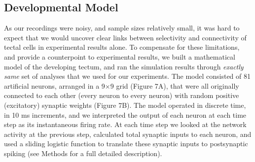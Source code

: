 \documentclass{article}
\begin{document}

\subsection*{Developmental Model}

As our recordings were noisy, and sample sizes relatively small, it was hard to expect that we would uncover clear links between selectivity and connectivity of tectal cells in experimental results alone. To compensate for these limitations, and provide a counterpoint to experimental results, we built a mathematical model of the developing tectum, and ran the simulation results through \textit{exactly same} set of analyses that we used for our experiments. The model consisted of 81 artificial neurons, arranged in a 9$\times$9 grid (Figure 7A), that were all originally connected to each other (every neuron to every neuron) with random positive (excitatory) synaptic weights (Figure 7B). The model operated in discrete time, in 10 ms increments, and we interpreted the output of each neuron at each time step as its instantaneous firing rate. At each time step we looked at the network activity at the previous step, calculated total synaptic inputs to each neuron, and used a sliding logistic function to translate these synaptic inputs to postsynaptic spiking (see Methods for a full detailed description).
\end{document}
